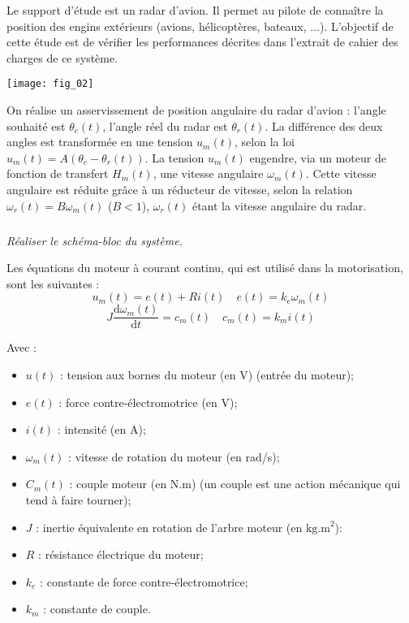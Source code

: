 \begin{multicols}{2}
Le support d'étude est un radar d'avion. Il permet au pilote de connaître la position des engins extérieurs (avions, hélicoptères, bateaux, ...). L'objectif de cette étude est de vérifier les performances décrites dans l’extrait de cahier des charges de ce système. 

\begin{center}
\texttt{[image: fig\_02]}
\end{center}

On réalise un asservissement de position angulaire du radar d’avion : l'angle souhaité est $\theta_c (t)$, l'angle réel du radar est $\theta_r (t)$. La différence des deux angles est transformée en une tension $u_m (t)$, selon la loi $u_m (t)= A(\theta_c - \theta_r (t))$. La tension $u_m (t)$ engendre, via un moteur de fonction de transfert $H_m (t)$, une vitesse angulaire $\omega_m (t)$. Cette vitesse angulaire est réduite grâce à un réducteur de vitesse, selon la relation $\omega_r (t) = B \omega_m (t)$ ($B<1$), $\omega_r (t)$ étant la vitesse angulaire du radar. 

\subparagraph{}\textit{Réaliser le schéma-bloc du système. }

Les équations du moteur à courant continu, qui est utilisé dans la motorisation, sont les suivantes : 
$$
u_m(t)=e(t)+Ri(t) 
\quad e(t)=k_e\omega_m(t) 
$$
$$J \dfrac{\text{d}\omega_m(t)}{\text{d}t} = c_m(t)
\quad c_m(t) = k_m i(t)
$$


Avec : 
\begin{itemize}
\item $u(t)$ : tension aux bornes du moteur (en V) (entrée du moteur);
\item $e(t)$ : force contre-électromotrice (en V);
\item $i(t)$ : intensité (en A);
\item $\omega_m (t)$ : vitesse de rotation du moteur (en rad/s);
\item $C_m (t)$ : couple moteur (en N.m) (un couple est une action mécanique qui tend à faire tourner); 
\item $J$ : inertie équivalente en rotation de l’arbre moteur (en $\text{kg.m}^2$): 
\item $R$ : résistance électrique du moteur;
\item $k_e$ : constante de force contre-électromotrice;
\item $k_m$ : constante de couple.
\end{itemize}



\end{multicols}
